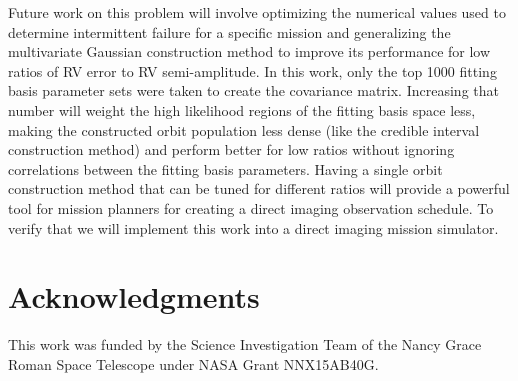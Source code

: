Future work on this problem will involve optimizing the numerical values used to determine
intermittent failure for a specific mission and generalizing the multivariate Gaussian construction
method to improve its performance for low ratios of RV error to RV semi-amplitude. In this work, only
the top 1000 fitting basis parameter sets were taken to create the covariance matrix.  Increasing
that number will weight the high likelihood regions of the fitting basis space less, making the
constructed orbit population less dense (like the credible interval construction method) and perform
better for low ratios without ignoring correlations between the fitting basis parameters.  Having a
single orbit construction method that can be tuned for different ratios will provide a powerful tool
for mission planners for creating a direct imaging observation schedule. To verify that we will
implement this work into a direct imaging mission simulator.

\section{Acknowledgments}
This work was funded by the Science Investigation Team of the Nancy Grace Roman Space Telescope
under NASA Grant NNX15AB40G.

